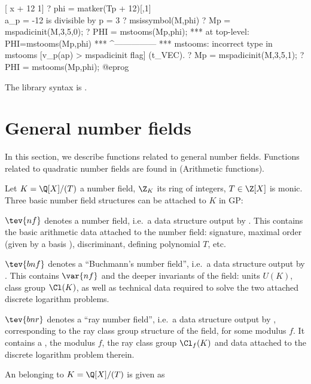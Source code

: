 [ x + 12 1]
? phi = matker(Tp + 12)[,1] \\ a_p = -12 is divisible by p = 3
? msissymbol(M,phi)
? Mp = mspadicinit(M,3,5,0);
? PHI = mstooms(Mp,phi);
 ***   at top-level: PHI=mstooms(Mp,phi)
 ***                     ^---------------
 *** mstooms: incorrect type in mstooms [v_p(ap) > mspadicinit flag] (t_VEC).
? Mp = mspadicinit(M,3,5,1);
? PHI = mstooms(Mp,phi);
@eprog

The library syntax is .

\section{General number fields}

In this section, we describe functions related to general number fields.
Functions related to quadratic number fields are found in
 (Arithmetic functions).


Let $K = \Q[X] / (T)$ a number field, $\Z_K$ its ring of integers, $T\in\Z[X]$
is monic. Three basic number field structures can be attached to $K$ in
GP:

\item $\tev{nf}$ denotes a number field, i.e.~a data structure output by
. This contains the basic arithmetic data attached to the
number field: signature, maximal order (given by a basis ),
discriminant, defining polynomial $T$, etc.

\item $\tev{bnf}$ denotes a ``Buchmann's number field'', i.e.~a
data structure output by . This contains
$\var{nf}$ and the deeper invariants of the field: units $U(K)$, class group
$\Cl(K)$, as well as technical data required to solve the two attached
discrete logarithm problems.

\item $\tev{bnr}$ denotes a ``ray number field'', i.e.~a data structure
output by , corresponding to the ray class group structure of
the field, for some modulus $f$. It contains a , the modulus
$f$, the ray class group $\Cl_f(K)$ and data attached to
the discrete logarithm problem therein.


\noindent An  belonging to $K = \Q[X]/(T)$ is given as


